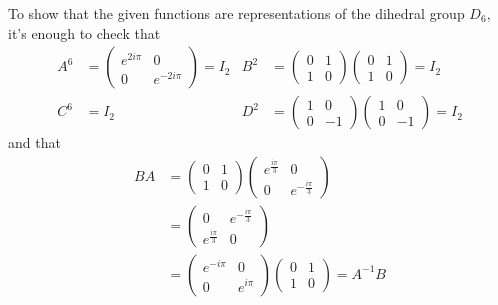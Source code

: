 \begin{solution}
To show that the given functions are representations of the dihedral group \(D_6\), it's enough to check that
\begin{align*}
    A^6 &= \begin{pmatrix}
        e^{2 i \pi} & 0 \\
        0 & e^{- 2 i \pi}
    \end{pmatrix} = I_2
    &
    B^2 &= \begin{pmatrix}
        0 & 1 \\
        1 & 0
    \end{pmatrix}
    \begin{pmatrix}
        0 & 1 \\
        1 & 0
    \end{pmatrix}
    = I_2 \\[0.5em]
    C^6 &= I_2
    &
    D^2 &= \begin{pmatrix}
        1 & 0 \\
        0 & -1
    \end{pmatrix}
    \begin{pmatrix}
        1 & 0 \\
        0 & -1
    \end{pmatrix} = I_2
\end{align*}
and that
\begin{align*}
    BA &= \begin{pmatrix}
        0 & 1 \\
        1 & 0
    \end{pmatrix}
    \begin{pmatrix}
        e^{\frac{i \pi}{3}} & 0 \\
        0 & e^{-\frac{i \pi}{3}}
    \end{pmatrix} \\
    &= \begin{pmatrix}
        0 & e^{-\frac{i \pi}{3}} \\
        e^{\frac{i \pi}{3}} & 0
    \end{pmatrix} \\
    &= \begin{pmatrix}
        e^{-i \pi} & 0 \\
        0 & e^{i \pi}
    \end{pmatrix}
    \begin{pmatrix}
        0 & 1 \\
        1 & 0
    \end{pmatrix}
    = A^{-1} B
\end{align*}

\end{solution}
